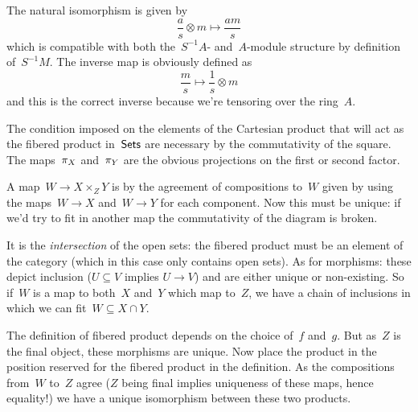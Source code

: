 \begin{exercise}
  The natural isomorphism is given by
  \begin{equation}
    \frac{a}{s}\otimes m\mapsto \frac{am}{s}
  \end{equation}
  which is compatible with both the~$S^{-1}A$- and~$A$\nobreakdash-module structure by definition of~$S^{-1}M$. The inverse map is obviously defined as
  \begin{equation}
    \frac{m}{s}\mapsto \frac{1}{s}\otimes m
  \end{equation}
  and this is the correct inverse because we're tensoring over the ring~$A$.
\end{exercise}

\begin{exercise}
  The condition imposed on the elements of the Cartesian product that will act as the fibered product in~$\mathsf{Sets}$ are necessary by the commutativity of the square. The maps~$\pi_X$ and~$\pi_Y$ are the obvious projections on the first or second factor.

  A map~$W\to X\times_Z Y$ is by the agreement of compositions to~$W$ given by using the maps~$W\to X$ and~$W\to Y$ for each component. Now this must be unique: if we'd try to fit in another map the commutativity of the diagram is broken.
\end{exercise}

\begin{exercise}
  It is the \emph{intersection} of the open sets: the fibered product must be an element of the category (which in this case only contains open sets). As for morphisms: these depict inclusion ($U\subseteq V$ implies $U\to V$) and are either unique or non-existing. So if~$W$ is a map to both~$X$ and~$Y$ which map to~$Z$, we have a chain of inclusions in which we can fit~$W\subseteq X\cap Y$.
\end{exercise}

\begin{exercise}
  The definition of fibered product depends on the choice of~$f$ and~$g$. But as~$Z$ is the final object, these morphisms are unique. Now place the product in the position reserved for the fibered product in the definition. As the compositions from~$W$ to~$Z$ agree ($Z$ being final implies uniqueness of these maps, hence equality!) we have a unique isomorphism between these two products.
\end{exercise}

